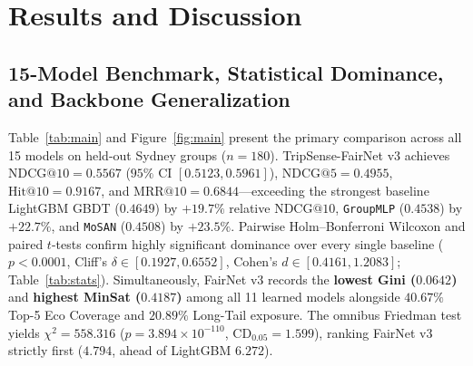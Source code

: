 \documentclass[final,5p,twocolumn]{elsarticle}
\begin{document}
\section{Results and Discussion}
\label{sec:results}
\subsection{15-Model Benchmark, Statistical Dominance, and Backbone Generalization}
Table~\ref{tab:main} and Figure~\ref{fig:main} present the primary comparison across all 15 models on held-out Sydney groups ($n{=}180$). TripSense-FairNet v3 achieves $\text{NDCG@10} = 0.5567$ ($95\%$ CI $[0.5123, 0.5961]$), $\text{NDCG@5} = 0.4955$, $\text{Hit@10} = 0.9167$, and $\text{MRR@10} = 0.6844$---exceeding the strongest baseline LightGBM GBDT ($0.4649$) by $+19.7\%$ relative $\text{NDCG@10}$, \texttt{GroupMLP} ($0.4538$) by $+22.7\%$, and \texttt{MoSAN} ($0.4508$) by $+23.5\%$. Pairwise Holm--Bonferroni Wilcoxon and paired $t$-tests confirm highly significant dominance over every single baseline ($p < 0.0001$, Cliff's $\delta \in [0.1927, 0.6552]$, Cohen's $d \in [0.4161, 1.2083]$; Table~\ref{tab:stats}). Simultaneously, FairNet v3 records the \textbf{lowest Gini ($0.0642$)} and \textbf{highest MinSat ($0.4187$)} among all 11 learned models alongside $40.67\%$ Top-5 Eco Coverage and $20.89\%$ Long-Tail exposure. The omnibus Friedman test yields $\chi^2 = 558.316$ ($p = 3.894 \times 10^{-110}$, $\text{CD}_{0.05} = 1.599$), ranking FairNet v3 strictly first ($4.794$, ahead of LightGBM $6.272$).
\end{document}
